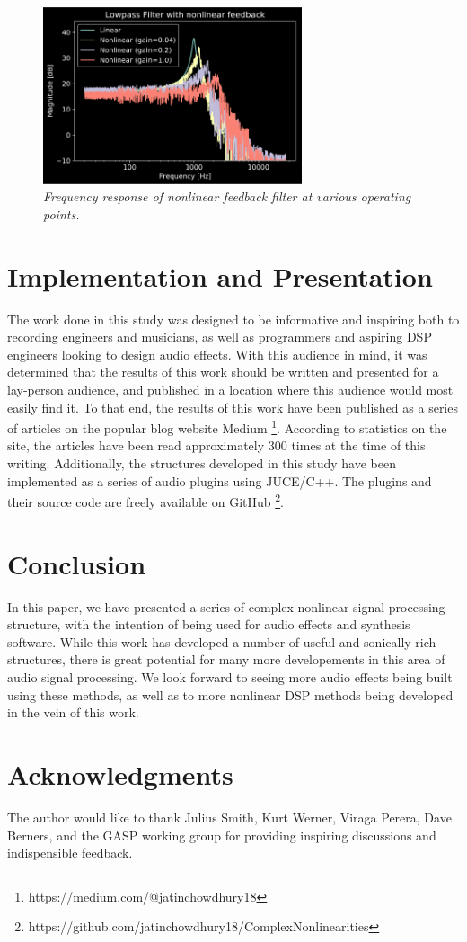 \documentclass[twoside,a4paper]{article}
\begin{document}
%
\begin{figure}[h]
    \center
    \includegraphics[width=3in]{../NonlinearFeedback/Pics/LPF-NL.png}
    \caption{\label{nlfd-lpf}{\it Frequency response of nonlinear feedback filter at
    various operating points.}}
\end{figure}
%

\section{Implementation and Presentation} \label{sec:pres}
%
The work done in this study was designed to be informative and inspiring
both to recording engineers and musicians, as well as programmers and
aspiring DSP engineers looking to design audio effects. With this audience
in mind, it was determined that the results of this work should be written
and presented for a lay-person audience, and published in a location where
this audience would most easily find it. To that end, the results of this
work have been published as a series of articles on the popular blog website
Medium \footnote{https://medium.com/@jatinchowdhury18}. According to
statistics on the site, the articles have been read approximately 300 times
at the time of this writing. Additionally, the structures developed in this
study have been implemented as a series of audio plugins using JUCE/C++.
The plugins and their source code are freely available on GitHub
\footnote{https://github.com/jatinchowdhury18/ComplexNonlinearities}.

\section{Conclusion} \label{sec:conclusion}
%
In this paper, we have presented a series of complex nonlinear signal
processing structure, with the intention of being used for audio effects
and synthesis software. While this work has developed a number of useful
and sonically rich structures, there is great potential for many more
developements in this area of audio signal processing. We look forward
to seeing more audio effects being built using these methods, as well as to
more nonlinear DSP methods being developed in the vein of this work.

\section{Acknowledgments}
%
The author would like to thank Julius Smith, Kurt Werner, Viraga Perera,
Dave Berners, and the GASP working group for providing inspiring discussions
and indispensible feedback.

\nocite{*}


\end{document}
